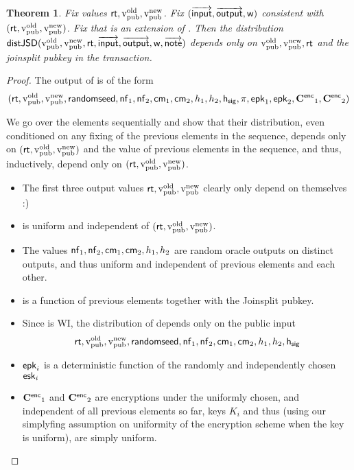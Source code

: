 \documentclass[11pt]{article}
\numberwithin{equation}{section} %
\numberwithin{figure}{section} %
\newtheorem{thm}{Theorem}[section]
\begin{document}
\begin{thm}\label{thm:privacy}
Fix values $\mathsf{rt},\mathrm{v_{pub}^{old}},\mathrm{v_{pub}^{new}}$.
Fix $(\overrightarrow{\mathsf{input}},\overrightarrow{\mathsf{output}},\mathsf{w})$ consistent with $(\mathsf{rt},\mathrm{v_{pub}^{old}},\mathrm{v_{pub}^{new}})$.
Fix \notes that is an extension of \outputs.
Then the distribution $\mathsf{distJSD}(\mathrm{v_{pub}^{old}},\mathrm{v_{pub}^{new}},\mathsf{rt},\overrightarrow{\mathsf{input}},\overrightarrow{\mathsf{output}},\mathsf{w},\overrightarrow{\mathsf{note}})$
 depends only on $\mathrm{v_{pub}^{old}},\mathrm{v_{pub}^{new}},\mathsf{rt}$ and the joinsplit pubkey in the transaction.
\end{thm}
\begin{proof}
The output of \makejsd is of the form
\[(\mathsf{rt},\mathrm{v_{pub}^{old}},\mathrm{v_{pub}^{new}},\mathsf{randomseed},\mathsf{nf}_1,\mathsf{nf}_2,\mathsf{cm}_1,\mathsf{cm}_2,h_1,h_2,\mathsf{h_{sig}},\pi,\mathsf{epk}_1,\mathsf{epk}_2,\mathbf{C^{\mathsf{enc}}}_1,\mathbf{C^{\mathsf{enc}}}_2)\]

We go over the elements sequentially and show that their distribution, even conditioned on any fixing of the previous elements in the sequence,
depends only on $(\mathsf{rt},\mathrm{v_{pub}^{old}},\mathrm{v_{pub}^{new}})$ and the value of previous elements in the sequence, and thus, inductively, depend only on $(\mathsf{rt},\mathrm{v_{pub}^{old}},\mathrm{v_{pub}^{new}})$.
\begin{itemize}
 \item  The first three output values $\mathsf{rt},\mathrm{v_{pub}^{old}},\mathrm{v_{pub}^{new}}$ clearly only depend on themselves :)
\item  \randomseed is uniform and independent of $(\mathsf{rt},\mathrm{v_{pub}^{old}},\mathrm{v_{pub}^{new}})$.
\item  The values $\mathsf{nf}_1,\mathsf{nf}_2,\mathsf{cm}_1,\mathsf{cm}_2,h_1,h_2$ are random oracle outputs on distinct outputs, and thus uniform and independent of previous elements
and each other.
\item \hsig is a function of previous elements together with the Joinsplit pubkey.
\item Since \snark is WI, the distribution of \prf depends only on the public input 
\[\mathsf{rt},\mathrm{v_{pub}^{old}},\mathrm{v_{pub}^{new}},\mathsf{randomseed},\mathsf{nf}_1,\mathsf{nf}_2,\mathsf{cm}_1,\mathsf{cm}_2,h_1,h_2,\mathsf{h_{sig}}\]
\item $\mathsf{epk}_i$ is a deterministic function of the randomly and independently chosen $\mathsf{esk}_i$
 \item $\mathbf{C^{\mathsf{enc}}}_1$ and $\mathbf{C^{\mathsf{enc}}}_2$ are encryptions under the uniformly chosen, and independent of all previous elements so far, keys $K_i$ and thus (using our simplyfing assumption on uniformity of the encryption scheme when the key is uniform), are simply uniform.
\end{itemize}

\end{proof}












\end{document}
